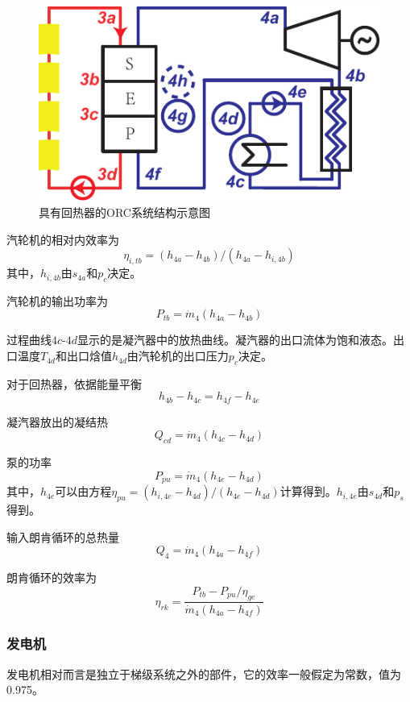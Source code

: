 \noindent \begin{figure}[htbp]
\centering
	\includegraphics[width = 0.4\columnwidth]{fig/ORCsystem2.pdf}
	\caption{具有回热器的ORC系统结构示意图}
	\label{fig:ORCsystem2}
\end{figure}

汽轮机的相对内效率为
\begin{equation}
  \eta_{i,tb} = (h_{4a}-h_{4b})/(h_{4a}-h_{i,4b})
\end{equation}
其中，$h_{i,4b}$由$s_{4a}$和$p_c$决定。

汽轮机的输出功率为
\begin{equation}
  P_{tb}=\dot{m}_4(h_{4a}-h_{4b})
\end{equation}

过程曲线$4c$-$4d$显示的是凝汽器中的放热曲线。凝汽器的出口流体为饱和液态。出口温度$T_{4d}$和出口焓值$h_{4d}$由汽轮机的出口压力$p_c$决定。

对于回热器，依据能量平衡
\begin{equation}
  h_{4b} - h_{4c} = h_{4f} - h_{4e}
\end{equation}

凝汽器放出的凝结热
\begin{equation}
  Q_{cd} = \dot{m}_4 (h_{4c} - h_{4d})
\end{equation}

泵的功率
\begin{equation}
P_{pu}=\dot{m}_{4}(h_{4e}-h_{4d})
\end{equation}  
其中，$h_{4e}$可以由方程$\eta_{pu} = (h_{i,4e}-h_{4d})/(h_{4e}-h_{4d})$计算得到。$h_{i,4e}$由$s_{4d}$和$p_s$得到。
    
输入朗肯循环的总热量
\begin{equation}
    Q_4=\dot{m}_4(h_{4a}-h_{4f})
\end{equation}

朗肯循环的效率为
\begin{equation}
	\eta_{rk}=\dfrac{P_{tb}-P_{pu}/\eta_{ge}}{\dot{m}_4(h_{4a}-h_{4f})}
\end{equation}

\subsubsection{发电机}
发电机相对而言是独立于梯级系统之外的部件，它的效率一般假定为常数，值为0.975。

